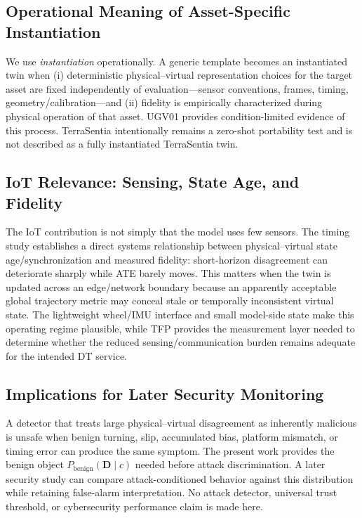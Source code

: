 \documentclass[journal]{IEEEtran}
\begin{document}
\subsection{Operational Meaning of Asset-Specific Instantiation}
We use \emph{instantiation} operationally. A generic template becomes an instantiated twin when (i) deterministic physical--virtual representation choices for the target asset are fixed independently of evaluation---sensor conventions, frames, timing, geometry/calibration---and (ii) fidelity is empirically characterized during physical operation of that asset. UGV01 provides condition-limited evidence of this process. TerraSentia intentionally remains a zero-shot portability test and is not described as a fully instantiated TerraSentia twin.

\subsection{IoT Relevance: Sensing, State Age, and Fidelity}
The IoT contribution is not simply that the model uses few sensors. The timing study establishes a direct systems relationship between physical--virtual state age/synchronization and measured fidelity: short-horizon disagreement can deteriorate sharply while ATE barely moves. This matters when the twin is updated across an edge/network boundary because an apparently acceptable global trajectory metric may conceal stale or temporally inconsistent virtual state. The lightweight wheel/IMU interface and small model-side state make this operating regime plausible, while TFP provides the measurement layer needed to determine whether the reduced sensing/communication burden remains adequate for the intended DT service.

\subsection{Implications for Later Security Monitoring}
A detector that treats large physical--virtual disagreement as inherently malicious is unsafe when benign turning, slip, accumulated bias, platform mismatch, or timing error can produce the same symptom. The present work provides the benign object $P_{\mathrm{benign}}(\mathbf{D}\mid c)$ needed before attack discrimination. A later security study can compare attack-conditioned behavior against this distribution while retaining false-alarm interpretation. No attack detector, universal trust threshold, or cybersecurity performance claim is made here.
\end{document}
